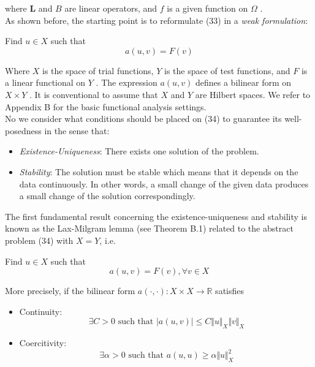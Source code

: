 where $ \mathbf{ L } $ and $ B $ are linear operators, and $ f $ is a given function on $ \Omega $ . \\
\indent As shown before, the starting point is to reformulate (33) in a \textit{weak formulation}:

\begin{center}
	Find $ u \in X $ such that
	\begin{equation}
		a(u,v) = F(v)
	\end{equation}
	
\end{center}

Where $ X $ is the space of trial functions, $ Y $ is the space of test functions, and $ F $ is a linear functional on $ Y $ . The expression $ a(u,v) $ defines a bilinear form on $ X \times Y $ . It is conventional to assume that $ X $ and $ Y $ are Hilbert spaces. We refer to Appendix B for the basic functional analysis settings. \\
\indent No we consider what conditions should be placed on (34) to guarantee its well-posedness in the sense that:

\begin{itemize}
	\item \textit{Existence-Uniqueness}: There exists one solution of the problem.
	\item \textit{Stability}: The solution must be stable which means that it depends on the data continuously. In other words, a small change of the given data produces a small change of the solution correspondingly.
\end{itemize}

\indent The first fundamental result concerning the existence-uniqueness and stability is known as the Lax-Milgram lemma (see Theorem B.1) related to the abstract problem (34) with $ X = Y $, i.e. \\
\indent

\begin{center}
	Find $ u \in X $ such that
	\begin{equation}
		a(u,v) = F(v), \forall v \in X
	\end{equation}
	
\end{center}

More precisely, if the bilinear form $ a(\cdot, \cdot): X \times X \to \mathbb{R} $ satisfies

\begin{itemize}
	\item Continuity:
		\begin{equation}
			\exists C > 0 \text{ such that } \vert a(u,v) \vert \leq C \Vert u \Vert_{ X } \Vert v \Vert_{ X }
		\end{equation}
		
	\item Coercitivity:
		\begin{equation}
			\exists \alpha > 0 \text{ such that } a(u,u) \geq \alpha \Vert u \Vert_{ X }^{ 2 }
		\end{equation}
\end{itemize}

